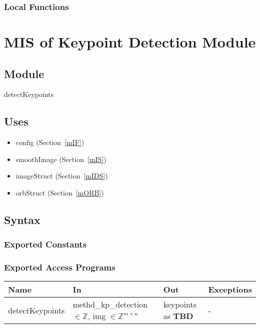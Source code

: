 \documentclass[12pt, titlepage]{article}
\begin{document}
\subsubsection{Local Functions}

 

\section{MIS of Keypoint Detection Module} \label{mKD}


\subsection{Module}

detectKeypoints

\subsection{Uses}
\begin{itemize}
  \item config (Section~\ref{mIF})
  \item smoothImage (Section~\ref{mIS})
  \item imageStruct (Section~\ref{mIDS})
  \item orbStruct (Section~\ref{mORB})
\end{itemize}

\subsection{Syntax}

\subsubsection{Exported Constants}

\subsubsection{Exported Access Programs}

\begin{center}
\begin{tabular}{p{3cm} p{4.5cm} p{4cm} p{2cm}}
\hline
\textbf{Name} & \textbf{In} & \textbf{Out} & \textbf{Exceptions} \\
\hline
detectKeypoints & methd\_kp\_detection $\in \mathbb{Z}$,\newline
img $\in \mathbb{Z}^{m \times n}$ & keypoints as \textbf{TBD} & - \\
\hline
\end{tabular}
\end{center}
\end{document}
